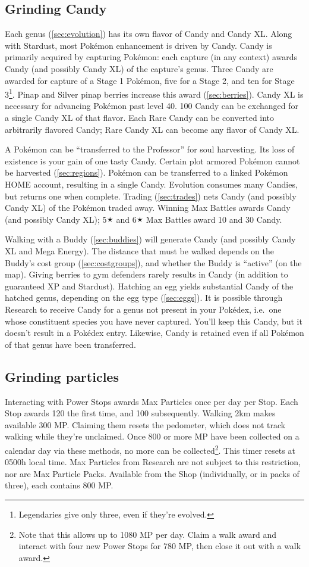 \subsection{Grinding Candy\label{subsec:getcandy}}
Each genus (\autoref{sec:evolution}) has its own flavor of Candy and Candy XL\@.
Along with Stardust, most Pokémon enhancement is driven by Candy.
Candy is primarily acquired by capturing Pokémon: each capture (in any context)
  awards Candy (and possibly Candy XL) of the capture's genus.
Three Candy are awarded for capture of a Stage 1 Pokémon, five for a Stage 2,
  and ten for Stage 3\footnote{Legendaries give only three, even if they're evolved.}.
Pinap and Silver pinap berries increase this award (\autoref{sec:berries}).
Candy XL is necessary for advancing Pokémon past level 40.
100 Candy can be exchanged for a single Candy XL of that flavor.
Each Rare Candy can be converted into arbitrarily flavored Candy; Rare Candy XL can become any flavor of Candy XL\@.

A Pokémon can be ``transferred to the Professor'' for soul harvesting.
Its loss of existence is your gain of one tasty Candy.
Certain plot armored Pokémon cannot be harvested (\autoref{sec:regions}).
Pokémon can be transferred to a linked Pokémon HOME account, resulting in a single Candy.
Evolution consumes many Candies, but returns one when complete.
Trading (\autoref{sec:trades}) nets Candy (and possibly Candy XL) of the Pokémon traded away.
Winning Max Battles awards Candy (and possibly Candy XL);
 5🟉 and 6🟉 Max Battles award 10 and 30 Candy.

Walking with a Buddy (\autoref{sec:buddies}) will generate Candy (and possibly Candy XL and Mega Energy).
The distance that must be walked depends on the Buddy's cost group (\autoref{sec:costgroups}),
 and whether the Buddy is ``active'' (on the map).
Giving berries to gym defenders rarely results in Candy (in addition to guaranteed XP and Stardust).
Hatching an egg yields substantial Candy of the hatched genus, depending on the egg type (\autoref{sec:eggs}).
It is possible through Research to receive Candy for a genus not present in
  your Pokédex, i.e.\ one whose constituent species you have never captured.
You'll keep this Candy, but it doesn't result in a Pokédex entry.
Likewise, Candy is retained even if all Pokémon of that genus have been transferred.
\subsection{Grinding particles}
Interacting with Power Stops awards Max Particles once per day per Stop.
Each Stop awards 120 the first time, and 100 subsequently.
Walking 2km makes available 300 MP\@.
Claiming them resets the pedometer, which does not track walking while they're unclaimed.
Once 800 or more MP have been collected on a calendar day via these methods, no
 more can be collected\footnote{Note that this allows up to 1080 MP per day.
 Claim a walk award and interact with four new Power Stops for 780 MP, then
 close it out with a walk award.}.
This timer resets at 0500h local time.
Max Particles from Research are not subject to this restriction, nor are Max Particle Packs.
Available from the Shop (individually, or in packs of three), each contains 800 MP\@.

